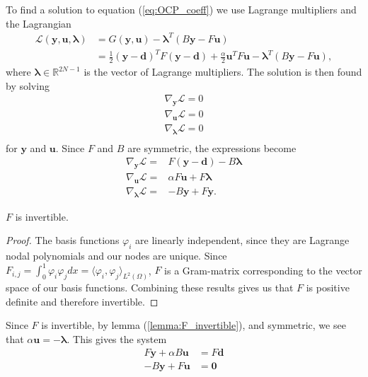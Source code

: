 To find a solution to equation (\ref{eq:OCP_coeff}) we use Lagrange multipliers and the Lagrangian
\begin{align}
    \label{eq:OCP_lagrangian}
    \mathcal{L}(\mathbf{y, u, \lambda}) &= G(\mathbf{y, u}) - \mathbf{\lambda}^T \left( B\mathbf{y} - F\mathbf{u} \right) \\
    &= \frac{1}{2} \left( \mathbf{y} - \mathbf{d} \right)^T F \left( \mathbf{y} - \mathbf{d} \right) + \frac{\alpha}{2}\mathbf{u}^T F \mathbf{u}- \mathbf{\lambda}^T \left( B\mathbf{y} - F\mathbf{u} \right) ,
\end{align}
where $\mathbf{\lambda} \in \mathds{R}^{2N-1}$ is the vector of Lagrange multipliers.
The solution is then found by solving
\begin{align}
    \label{eq:gradients}
    \nabla_{\mathbf{y}}\mathcal{L} = 0 \\
    \nabla_{\mathbf{u}}\mathcal{L} = 0 \\
    \nabla_{\mathbf{\mathbf{\lambda}}}\mathcal{L} = 0 \\
\end{align}
for $\mathbf{y}$ and $\mathbf{u}$.
Since $F$ and $B$ are symmetric, the expressions become
\begin{align}
    \nabla_{\mathbf{y}}\mathcal{L} =& F \left( \mathbf{y}- \mathbf{d}\right) - B\mathbf{\lambda} \\
    \nabla_{\mathbf{u}}\mathcal{L} =&  \alpha F \mathbf{u}+ F\mathbf{\lambda} \\
    \nabla_{\mathbf{\lambda}}\mathcal{L} =& -B \mathbf{y} + F \mathbf{y}.
\end{align}
\begin{lemma}
    $F$ is invertible.    
\end{lemma}
\begin{proof}
    \label{lemma:F_invertible}
    The basis functions $\varphi_i$ are linearly independent, since they are Lagrange nodal polynomials and our nodes are unique.
    Since $F_{i,j} = \int_0^1 \varphi_i \varphi_j dx = \langle \varphi_i, \varphi_j \rangle_{L^2(\Omega)}$,
    $F$ is a Gram-matrix corresponding to the vector space of our basis functions.
    Combining these results gives us that $F$ is positive definite and therefore invertible.
\end{proof}
Since $F$ is invertible, by lemma (\ref{lemma:F_invertible}), and symmetric, we see that $\alpha \mathbf{u}= -\mathbf{\lambda}$. 
This gives the system
\begin{align}
    \label{eq:lagrange_conditions}
     F \mathbf{y} + \alpha B \mathbf{u} &= F\mathbf{d} \\
    -B \mathbf{y} + F \mathbf{u} &= \mathbf{0}
\end{align}

